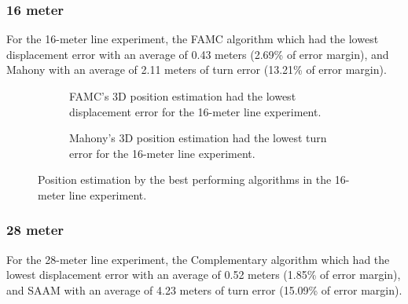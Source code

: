 \newpage

\subsubsection{16 meter}

For the 16-meter line experiment, the FAMC algorithm which had the lowest displacement error with an average of 0.43 meters (2.69\% of error margin), and Mahony with an average of 2.11 meters of turn error (13.21\% of error margin).

\vspace{-0.5cm}

\vspace{-1.5cm}

\begin{figure}[H]
    \centering
    \begin{subfigure}{0.49\textwidth}
        \centering
        \resizebox{1\linewidth}{!}{}
        \caption{ FAMC's 3D position estimation had the lowest displacement error for the 16-meter line experiment. }
        \label{fig:line16_2D}
    \end{subfigure}
    \begin{subfigure}{0.49\textwidth}
        \centering
        \resizebox{1\linewidth}{!}{}
        \caption{Mahony's 3D position estimation had the lowest turn error for the 16-meter line experiment.}
        \label{fig:line16_3D}
    \end{subfigure}
    \caption{Position estimation by the best performing algorithms in the 16-meter line experiment.}
    \label{fig:line16}
\end{figure}

\newpage

\subsubsection{28 meter}

For the 28-meter line experiment, the Complementary algorithm which had the lowest displacement error with an average of 0.52 meters (1.85\% of error margin), and SAAM with an average of 4.23 meters of turn error (15.09\% of error margin).

\vspace{-0.5cm}

\vspace{-1.5cm}

